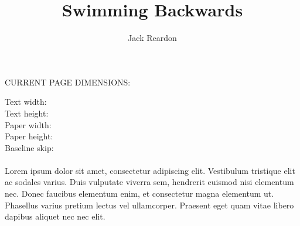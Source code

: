 \documentclass{scrbook}
\author{Jack Reardon}
\title{Swimming Backwards}
\date{}
\begin{document}
\maketitle

\begin{center}\Large
\vspace*{2em}
CURRENT PAGE DIMENSIONS:
\medskip

Text width: \Convert[unit=in]{\the\textwidth}\\
Text height: \Convert[unit=in]{\the\textheight}\\
Paper width: \Convert[unit=in]{\the\paperwidth}\\
Paper height: \Convert[unit=in]{\the\paperheight}\\
Baseline skip: \\
\normalsize\the\baselineskip\\
Lorem ipsum dolor sit amet, consectetur adipiscing elit. Vestibulum tristique
elit ac sodales varius. Duis vulputate viverra sem, hendrerit euismod nisi
elementum nec. Donec faucibus elementum enim, et consectetur magna elementum ut.
Phasellus varius pretium lectus vel ullamcorper. Praesent eget quam vitae libero
dapibus aliquet nec nec elit.
\end{center}

\tableofcontents
\titlemark


\end{document}
